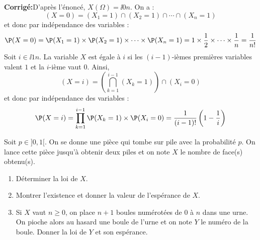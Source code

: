 \documentclass[a4paper,twoside,french,11pt]{VcCours}
\newcommand{\corr}{\textbf{Corrigé:}}
\begin{document}
\corr  D'après l'énoncé, $X(\Omega) = \ii{0}{n}$. On a :
$$ (X=0)= (X_1=1) \cap (X_2=1) \cap \cdots \cap (X_n=1)$$
et donc par indépendance des variables :
$$ \P(X=0) = \P(X_1=1) \times \P(X_2=1) \times \cdots \times \P(X_n=1) = 1 \times \dfrac{1}{2} \times \cdots \times \dfrac{1}{n} = \dfrac{1}{n!} $$
Soit $i \in \ii{1}{n}$. La variable $X$ est égale à $i$ si les $(i-1)$-ièmes premières variables valent $1$ et la $i$-ième vaut $0$. Ainsi,
$$(X=i) = \left(\bigcap_{k=1}^{i-1} (X_k=1)\right) \cap (X_i=0)$$
et donc par indépendance des variables :
$$ \P(X=i) = \prod_{k=1}^{i-1} \P(X_k=1) \times \P(X_i=0) = \dfrac{1}{(i-1)!} \left(1 - \dfrac{1}{i}\right)$$

\begin{Exercice}{} Soit $p \in ]0,1[$. On se donne une pièce qui tombe sur pile avec la probabilité $p$. On lance cette pièce jusqu'à obtenir deux piles et on note $X$ le nombre de face(s) obtenu(s).

\begin{enumerate}
\item Déterminer la loi de $X$.
\item Montrer l'existence et donner la valeur de l'espérance de $X$.
\item Si $X$ vaut $n \geq 0$, on place $n+1$ boules numérotées de $0$ à $n$ dans une urne. On pioche alors au hasard une boule de l'urne et on note $Y$ le numéro de la boule. Donner la loi de $Y$ et son espérance.
\end{enumerate}   
\end{Exercice}
\end{document}
